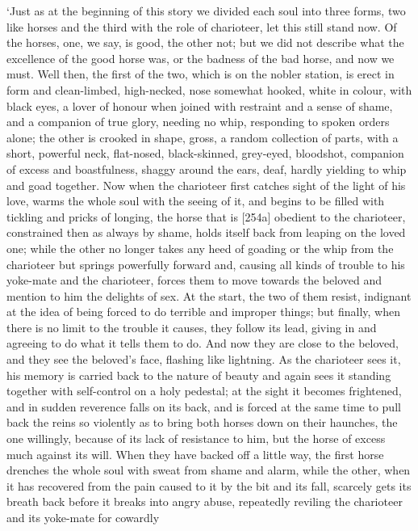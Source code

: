 ‘Just as at the beginning of this story we divided each soul into three
forms, two like horses
and the third with the role  of charioteer, let this still stand
now. Of the horses, one, we say, is good, the other not; but we did not
describe what the excellence of the good horse was, or the badness of
the bad horse, and now we must. Well then, the first of the two, which
is on the nobler
station, is erect in
form and clean-limbed,  high-necked, nose somewhat hooked, white
in colour, with black eyes, a lover of honour when joined with restraint
and a sense of shame, and a companion of true glory, needing no whip,
responding to spoken
orders alone; the other
is crooked  in shape, gross, a random collection of parts, with
a short, powerful neck, flat-nosed, black-skinned, grey-eyed, bloodshot,
companion of excess and
boastfulness, shaggy around the ears, deaf, hardly yielding to whip and
goad together. Now  when the charioteer first catches sight of
the light of his love, warms the whole soul with the seeing of it, and
begins to be filled with tickling and pricks of longing, the horse that
is {[}254a{]} obedient to the charioteer, constrained then as always by
shame, holds itself back from leaping on the loved one; while the other
no longer takes any heed of goading or the whip from the charioteer but
springs powerfully forward and, causing all  kinds of trouble to
his yoke-mate and the charioteer, forces them to move towards the
beloved and mention to him the delights of sex. At the start, the two of
them resist, indignant  at the idea of being forced to do
terrible and improper things; but finally, when there is no limit to the
trouble it causes, they follow its lead, giving in and agreeing to do
what it tells them to do. And now they are close to the beloved, and
they see the beloved's face, flashing like lightning. As the charioteer
sees it,  his memory is carried back to the nature of beauty and
again sees it standing together with self-control on a holy pedestal; at
the sight it becomes frightened, and in sudden reverence falls on its
back, and is forced at the same time to pull back the reins  so
violently as to bring both horses down on their haunches, the one
willingly, because of its lack of resistance to him, but the horse of
excess much against its
will. When they have backed off a little way, the first horse drenches
the whole soul  with sweat from shame and alarm, while the
other, when it has recovered from the pain caused to it by the bit and
its fall, scarcely gets its breath back before it breaks into angry
abuse, repeatedly reviling the charioteer and its yoke-mate for cowardly
